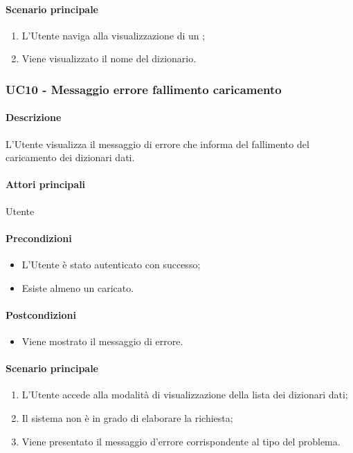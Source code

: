 \paragraph*{Scenario principale}
\begin{enumerate}
  \item L’Utente naviga alla visualizzazione di un ;
  \item Viene visualizzato il nome del dizionario.
\end{enumerate}

\subsubsection{UC10 - Messaggio errore fallimento caricamento }\label{UC10}

\paragraph*{Descrizione} L’Utente visualizza il messaggio di errore che informa del fallimento del caricamento dei dizionari dati.

\paragraph*{Attori principali} Utente

\paragraph*{Precondizioni}
\begin{itemize}
  \item L’Utente è stato autenticato con successo;
  \item Esiste almeno un  caricato.  
\end{itemize}

\paragraph*{Postcondizioni}
\begin{itemize}
  \item Viene mostrato il messaggio di errore.
\end{itemize}

\paragraph*{Scenario principale}
\begin{enumerate}
  \item L’Utente accede alla modalità di visualizzazione della lista dei dizionari dati;
  \item Il sistema non è in grado di elaborare la richiesta;
  \item Viene presentato il messaggio d’errore corrispondente al tipo del problema.  
\end{enumerate}


